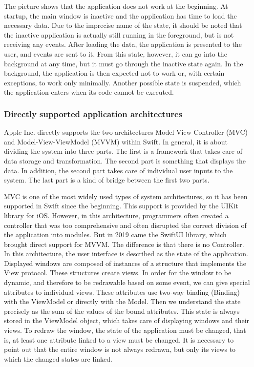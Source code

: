 \documentclass[
  biblatex = false,
  language=english,
  figures=false,
  sourcecodes,
  glossaries,
  index
]{kidiplom}
\begin{document}
The picture shows that the application does not work at the beginning. At startup, the main window is inactive and the application has time to load the necessary data. Due to the imprecise name of the state, it should be noted that the inactive application is actually still running in the foreground, but is not receiving any events. After loading the data, the application is presented to the user, and events are sent to it. From this state, however, it can go into the background at any time, but it must go through the inactive state again. In the background, the application is then expected not to work or, with certain exceptions, to work only minimally. Another possible state is suspended, which the application enters when its code cannot be executed.

\subsubsection{Directly supported application architectures}
Apple Inc. directly supports the two architectures Model-View-Controller (MVC) and Model-View-ViewModel (MVVM) within Swift. In general, it is about dividing the system into three parts. The first is a framework that takes care of data storage and transformation. The second part is something that displays the data. In addition, the second part takes care of individual user inputs to the system. The last part is a kind of bridge between the first two parts.

MVC is one of the most widely used types of system architectures, so it has been supported in Swift since the beginning. This support is provided by the UIKit library for iOS. However, in this architecture, programmers often created a controller that was too comprehensive and often disrupted the correct division of the application into modules. But in 2019 came the SwiftUI library, which brought direct support for MVVM. 
The difference is that there is no Controller. In this architecture, the user interface is described as the state of the application. Displayed windows are composed of instances of a structure that implements the View protocol. These structures create views. In order for the window to be dynamic, and therefore to be redrawable based on some event, we can give special attributes to individual views. These attributes use two-way binding (Binding) with the ViewModel or directly with the Model. Then we understand the state precisely as the sum of the values of the bound attributes. This state is always stored in the ViewModel object, which takes care of displaying windows and their views. To redraw the window, the state of the application must be changed, that is, at least one attribute linked to a view must be changed. It is necessary to point out that the entire window is not always redrawn, but only its views to which the changed states are linked.
\end{document}
